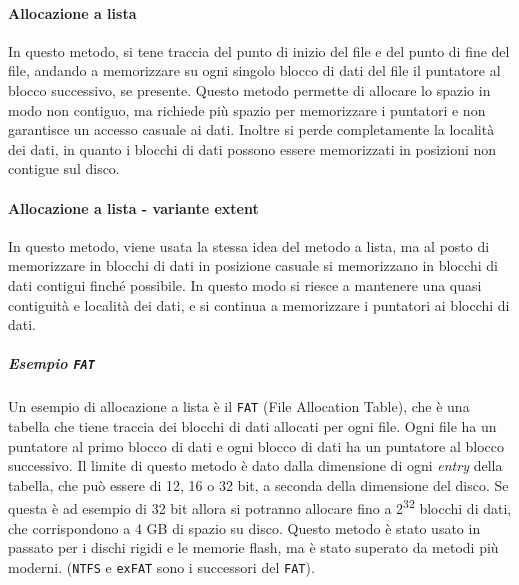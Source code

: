         \paragraph{Allocazione a lista} In questo metodo, si tene traccia del punto di inizio del file e del punto di fine del file, andando a memorizzare su ogni singolo blocco di dati del file il puntatore al blocco successivo, se presente. Questo metodo permette di allocare lo spazio in modo non contiguo, ma richiede più spazio per memorizzare i puntatori e non garantisce un accesso casuale ai dati. Inoltre si perde completamente la località dei dati, in quanto i blocchi di dati possono essere memorizzati in posizioni non contigue sul disco.
        \paragraph{Allocazione a lista - variante extent} In questo metodo, viene usata la stessa idea del metodo a lista, ma al posto di memorizzare in blocchi di dati in posizione casuale si memorizzano in blocchi di dati contigui finché possibile. In questo modo si riesce a mantenere una quasi contiguità e località dei dati, e si continua a memorizzare i puntatori ai blocchi di dati. 
            \subparagraph{Esempio \texttt{FAT}} Un esempio di allocazione a lista è il \texttt{FAT} (File Allocation Table), che è una tabella che tiene traccia dei blocchi di dati allocati per ogni file. Ogni file ha un puntatore al primo blocco di dati e ogni blocco di dati ha un puntatore al blocco successivo. Il limite di questo metodo è dato dalla dimensione di ogni \textit{entry} della tabella, che può essere di 12, 16 o 32 bit, a seconda della dimensione del disco. Se questa è ad esempio di 32 bit allora si potranno allocare fino a 2\textsuperscript{32} blocchi di dati, che corrispondono a 4 GB di spazio su disco. Questo metodo è stato usato in passato per i dischi rigidi e le memorie flash, ma è stato superato da metodi più moderni. (\texttt{NTFS} e \texttt{exFAT} sono i successori del \texttt{FAT}).